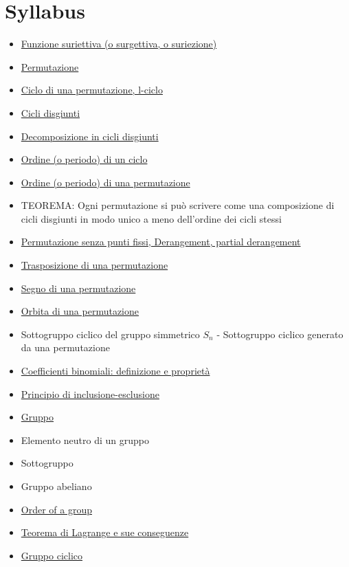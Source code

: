 \documentclass[a4paper,10pt]{article}
\begin{document}
\section{Syllabus}
\begin{itemize}
 \item \href{./FunzioneSuriettiva.html}{Funzione suriettiva (o surgettiva, o suriezione)}
 
 \item \href{./Permutazione.html}{Permutazione}
 \item \href{./PermutazioneCicli.html}{Ciclo di una permutazione, l-ciclo}
 \item \href{./PermutazioniDisgiunte.html}{Cicli disgiunti}
 \item \href{./PermutazioneDecomposizioneCicli.html}{Decomposizione in cicli disgiunti}
 \item \href{./PermutazioneCicliPeriodo.html}{Ordine (o periodo) di un ciclo}
 \item \href{./PermutazionePeriodo.html}{Ordine (o periodo) di una permutazione}
 \item TEOREMA: Ogni permutazione si può scrivere come una composizione di cicli disgiunti in modo unico a meno dell'ordine dei cicli stessi
 \item \href{./Derangement.html}{Permutazione senza punti fissi, Derangement, partial derangement}
 \item \href{./PermutazioneTrasposizione.html}{Trasposizione di una permutazione}
 \item \href{./PermutazioneSegno.html}{Segno di una permutazione}
 \item \href{./PermutazioneOrbita.html}{Orbita di una permutazione}
 \item Sottogruppo ciclico del gruppo simmetrico $S_n$ - Sottogruppo ciclico generato da una permutazione
 \item \href{./CoefficientiBinomiali.html}{Coefficienti binomiali: definizione e proprietà}
 \item \href{./PrincipioInclusioneEsclusione.html}{Principio di inclusione-esclusione}
 
 \item \href{./Gruppo.html}{Gruppo}
 \item Elemento neutro di un gruppo
 \item Sottogruppo
 \item Gruppo abeliano
 \item \href{./OrderOfGroup.html}{Order of a group}
 \item \href{./TeoremaDiLagrange.html}{Teorema di Lagrange e sue conseguenze} 
 \item \href{./CyclicGroup.html}{Gruppo ciclico}
 

\end{itemize}
\end{document}
